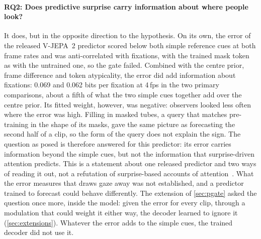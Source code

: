 \paragraph{RQ2: Does predictive surprise carry information about where people
look?} It does, but in the opposite direction to the hypothesis. On its own,
the error of the released \acrshort{V-JEPA}~2 predictor scored below both simple
reference cues at both frame rates and was anti-correlated with fixations,
with the trained mask token as with the untrained one, so the gate failed.
Combined with the centre prior, frame difference and token atypicality, the
error did add information about fixations: 0.069 and 0.062 bits per fixation
at 4\,fps in the two primary comparisons, about a fifth of what the two simple
cues together add over the centre prior. Its fitted weight, however, was
negative: observers looked less often where the error was high. Filling in
masked tubes, a query that matches pre-training in the shape of its masks, gave
the same picture as forecasting the second half of a clip, so the form of the
query does not explain the sign. The question as posed is therefore answered
for this predictor: its error carries information beyond the simple cues, but
not the information that surprise-driven attention predicts. This is a
statement about one released predictor and two ways of reading it out, not a
refutation of surprise-based accounts of attention~\cite{itti2009bayesian}.
What the error measures that draws gaze away was not established, and a
predictor trained to forecast could behave differently. The extension of
\cref{sec:pgate} asked the question once more, inside the model: given the error
for every clip, through a modulation that could weight it either way, the
decoder learned to ignore it (\cref{sec:extensions}). Whatever the error adds to
the simple cues, the trained decoder did not use it.

